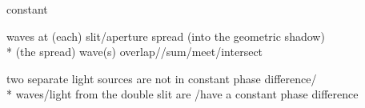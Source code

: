 \begin{question}%

  constant ~\hfill{}
\end{question}

\begin{question}%

  waves at (each) slit/aperture spread (into the geometric shadow)~\hfill{}\\*
  (the spread) wave(s) overlap//sum/meet/intersect~\hfill{}
\end{question}

\begin{question}%

  two separate light sources are not in constant phase difference/~\hfill\\*
  \OR waves/light from the double slit are /have a constant phase difference~\hfill{}
\end{question}


